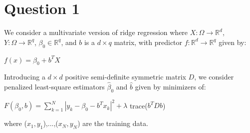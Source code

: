 \section*{Question 1}
We consider a multivariate version of ridge regression where $X : \Omega \rightarrow \mathbb{R}^{d}$, $Y : \Omega \rightarrow \mathbb{R}^{q}$, $\beta_{0} \in \mathbb{R}^{q}$, and $b$ is a $d \times q$ matrix, with predictor $f : \mathbb{R}^{d} \rightarrow \mathbb{R}^{q}$ given by:
\begin{center}
    $f(x) = \beta_{0} + b^{T}X$
\end{center}
Introducing a $d \times d$ positive semi-definite symmetric matrix $D$, we consider penalized least-square estimators $\hat{\beta}_{0}$ and $\hat{b}$ given by minimizers of:
\begin{center}
    $F(\beta_{0}, b) = \sum\limits_{k=1}^N|y_{k} - \beta_{0} - b^{T}x_{k}|^{2} + \lambda$ trace($b^{T}Db$)
\end{center}
where ($x_{1}, y_{1}$),...,($x_{N}, y_{N}$) are the training data.
\vspace{5mm}

